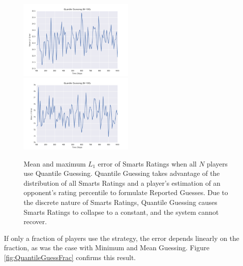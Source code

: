 \begin{figure}[H]
\centerline{%
\includegraphics[width=0.5\textwidth]{figures/robustness/Quantile_Guessing21.png}%
\includegraphics[width=0.5\textwidth] {figures/robustness/Quantile_Guessing22.png}%
}%
\caption{Mean and maximum $L_1$ error of Smarts Ratings when all $N$ players use Quantile Guessing. Quantile Guessing takes advantage of the distribution of all Smarts Ratings and a player's estimation of an opponent's rating percentile to formulate Reported Guesses. Due to the discrete nature of Smarts Ratings, Quantile Guessing causes Smarts Ratings to collapse to a constant, and the system cannot recover.}
\label{fig:QuantileGuess}
\end{figure}

If only a fraction of players use the strategy, the error depends linearly on the fraction, as was the case with Minimum and Mean Guessing. Figure \ref{fig:QuantileGuessFrac} confirms this result.

